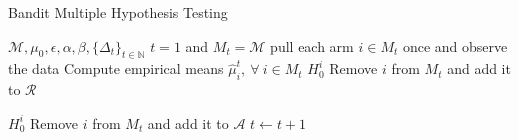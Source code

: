 \documentclass[12pt]{article}
\def\MM{\mathcal{M}}
\def\RR{\mathcal{R}}
\def\AA{\mathcal{A}}
\begin{document}
\begin{algorithm}[tb]
   \caption{Bandit Multiple Hypothesis Testing}
   \label{alg1}
\begin{algorithmic}
    $\MM,\mu_0,\epsilon,\alpha,\beta,\{\Delta_t\}_{t\in\mathbb{N}}$
    $t=1$ and $M_t = \MM$
   \STATE pull each arm $i\in M_t$ once and observe the data
   \STATE Compute empirical means $\hat\mu^t_i,~\forall~i\in M_t$
  		 $H_0^i$
  		\STATE Remove $i$ from $M_t$ and add it to $\RR$
  	\ENDIF
  	
  		 $H_0^i$
  		\STATE Remove $i$ from $M_t$ and add it to $\AA$
  	\ENDIF
  \ENDFOR
  \STATE $t \leftarrow t+1$
   \ENDWHILE
   
\end{algorithmic}
\end{algorithm} 
\end{document}
